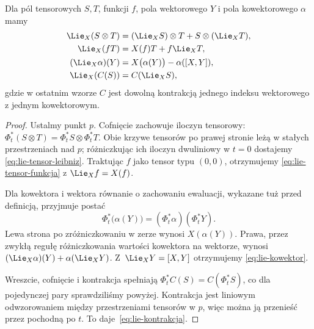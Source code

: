 \begin{twierdzenie}
\label{thm:lie-tensor-reguly}
Dla pól tensorowych $S,T$, funkcji $f$, pola wektorowego
$Y$ i pola kowektorowego $\alpha$ mamy
\begin{align}
 \Lie_X(S\otimes T)
 &= (\Lie_XS)\otimes T+S\otimes(\Lie_XT),
 \label{eq:lie-tensor-leibniz}\\
 \Lie_X(fT)&=X(f)T+f\Lie_XT,
 \label{eq:lie-tensor-funkcja}\\
 (\Lie_X\alpha)(Y)
 &=X\bigl(\alpha(Y)\bigr)-\alpha([X,Y]),
 \label{eq:lie-kowektor}\\
 \Lie_X(C(S))&=C(\Lie_XS),
 \label{eq:lie-kontrakcja}
\end{align}
gdzie w ostatnim wzorze $C$ jest dowolną kontrakcją
jednego indeksu wektorowego z jednym kowektorowym.
\end{twierdzenie}
\begin{proof}
Ustalmy punkt $p$. Cofnięcie zachowuje iloczyn tensorowy:
$\Phi_t^*(S\otimes T)=\Phi_t^*S\otimes\Phi_t^*T$.
Obie krzywe tensorów po prawej stronie leżą w stałych
przestrzeniach nad $p$; różniczkując ich iloczyn
dwuliniowy w $t=0$ dostajemy
\eqref{eq:lie-tensor-leibniz}. Traktując $f$ jako tensor
typu $(0,0)$, otrzymujemy
\eqref{eq:lie-tensor-funkcja} z $\Lie_Xf=X(f)$.

Dla kowektora i wektora równanie o zachowaniu ewaluacji,
wykazane tuż przed definicją, przyjmuje postać
\[
 \Phi_t^*\bigl(\alpha(Y)\bigr)
 =(\Phi_t^*\alpha)(\Phi_t^*Y).
\]
Lewa strona po zróżniczkowaniu w zerze wynosi
$X(\alpha(Y))$. Prawa, przez zwykłą regułę
różniczkowania wartości kowektora na wektorze,
wynosi $(\Lie_X\alpha)(Y)+\alpha(\Lie_XY)$.
Z~$\Lie_XY=[X,Y]$ otrzymujemy
\eqref{eq:lie-kowektor}.

Wreszcie, cofnięcie i kontrakcja spełniają
$\Phi_t^*C(S)=C(\Phi_t^*S)$, co dla pojedynczej
pary sprawdziliśmy powyżej. Kontrakcja jest liniowym
odwzorowaniem między przestrzeniami tensorów w $p$, więc
można ją przenieść przez pochodną po $t$.
To daje~\eqref{eq:lie-kontrakcja}.
\end{proof}

